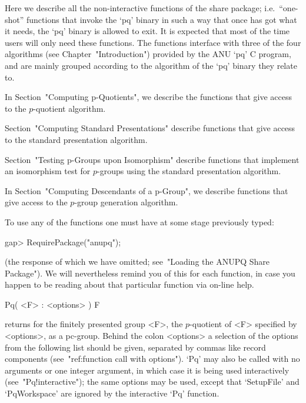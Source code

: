 

Here we describe all the non-interactive functions of the {\ANUPQ}  share
package; i.e.~``one-shot'' functions that invoke the `pq' binary in  such
a way that once {\GAP} has got what it needs, the `pq' binary is  allowed
to exit. It is expected that most of the time users will only need  these
functions. The functions interface with three of the four algorithms (see
Chapter~"Introduction") provided by the  ANU  `pq'  C  program,  and  are
mainly grouped according to the algorithm of the `pq' binary they  relate
to.

In Section~"Computing p-Quotients", we describe the functions  that  give
access to the $p$-quotient algorithm.

Section~"Computing Standard Presentations" describe functions  that  give
access to the standard presentation algorithm.

Section~"Testing  p-Groups  upon  Isomorphism"  describe  functions  that
implement  an  isomorphism  test  for  $p$-groups  using   the   standard
presentation algorithm.

In Section~"Computing Descendants of a p-Group",  we  describe  functions
that give access to the $p$-group generation algorithm.

To use any of the functions one must have at some stage previously typed:

\beginexample
gap> RequirePackage("anupq");
\endexample

(the response of which we have  omitted;  see~"Loading  the  ANUPQ  Share
Package"). We will nevertheless remind you of this for each function,  in
case you happen to be reading about that particular function via  on-line
help.


\>Pq( <F> : <options> ) F

returns for the finitely presented group <F>,  the  $p$-quotient  of  <F>
specified by <options>, as a  pc-group.  Behind  the  colon  <options>  a
selection of the  options  from  the  following  list  should  be  given,
separated by commas like record components (see~"ref:function  call  with
options"). `Pq' may also be called  with  no  arguments  or  one  integer
argument,   in   which   case   it   is    being    used    interactively
(see~"Pq!interactive");  the  same  options  may  be  used,  except  that
`SetupFile'  and  `PqWorkspace'  are  ignored  by  the  interactive  `Pq'
function.

